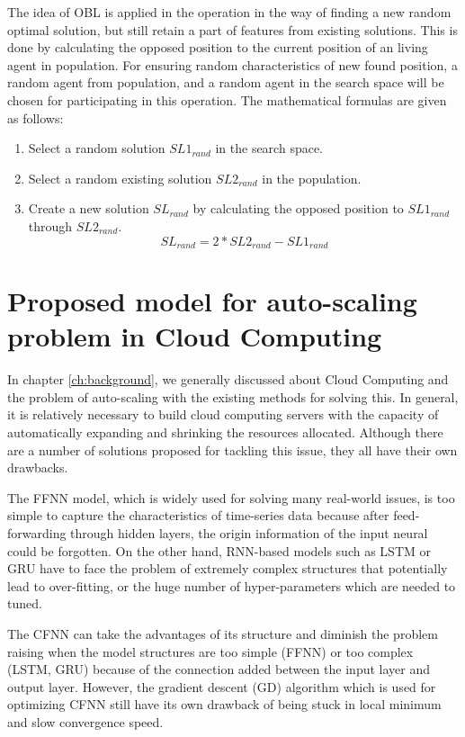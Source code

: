 \documentclass[a4paper,13pt,2p]{report}
\begin{document}
	
	The idea of OBL is applied in the operation in the way of finding a new random optimal solution, but still retain a part of features from existing solutions. This is done by calculating the opposed position to the current position of an living agent in population. For ensuring random characteristics of new found position, a random agent from population, and a random agent in the search space will be chosen for participating in this operation. The mathematical formulas are given as follows:
\begin{enumerate}
\item Select a random solution $SL1_{rand}$ in the search space.
\item Select a random existing solution $SL2_{rand}$ in the population.
\item Create a new solution $SL_{rand}$ by calculating the opposed position to $SL1_{rand}$ through $SL2_{rand}$.
\begin{equation} \label{islo_eq4}
SL_{rand} = 2*SL2_{rand} - SL1_{rand}
\end{equation}
\end{enumerate}

\section{Proposed model for auto-scaling problem in Cloud Computing}
\label{sec:proposed_model}
	
	In chapter \ref{ch:background}, we generally discussed about Cloud Computing and the problem of auto-scaling with the existing methods for solving this. In general, it is relatively necessary to build cloud computing servers with the capacity of automatically expanding and  shrinking the resources allocated. Although there are a number of solutions proposed for tackling this issue, they all have their own drawbacks.
	
	The FFNN model, which is widely used for solving many real-world issues, is too simple to capture the characteristics of time-series data because after feed-forwarding through hidden layers, the origin information of the input neural could be forgotten. On the other hand, RNN-based models such as LSTM or GRU have to face the problem of extremely complex structures that potentially lead to over-fitting, or the huge number of hyper-parameters which are needed to tuned.
	
	The CFNN can take the advantages of its structure and diminish the problem raising when the model structures are too simple (FFNN) or too complex (LSTM, GRU) because of the connection added between the input layer and output layer. However, the gradient descent (GD) algorithm which is used for optimizing CFNN still have its own drawback of being stuck in local minimum and slow convergence speed. 
	
\end{document}
